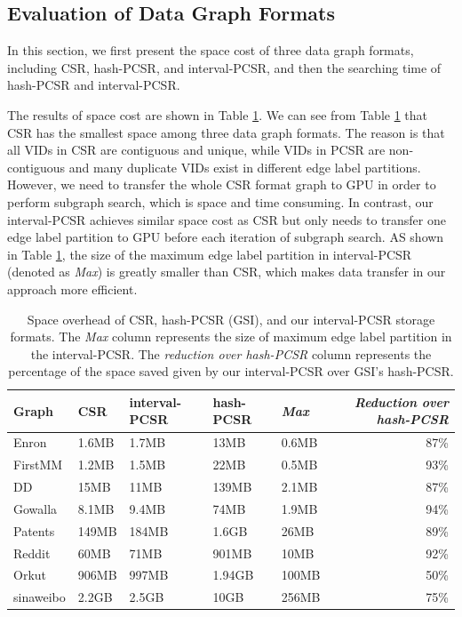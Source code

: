 \subsection{Evaluation of Data Graph Formats}
In this section, we first present the space cost of three data graph formats, including CSR, hash-PCSR, and  interval-PCSR, and then the searching time of hash-PCSR and interval-PCSR.

The results of space cost are shown in Table \ref{tab:graphsize}. We can see from Table \ref{tab:graphsize} that CSR has the smallest space among three data graph formats. The reason is that all VIDs in CSR are contiguous and unique, while VIDs in PCSR are non-contiguous and many duplicate VIDs exist in different edge label partitions. However, we need to transfer the whole CSR format graph to GPU in order to perform subgraph search, which is space and time consuming. In contrast, our interval-PCSR achieves similar space cost as CSR but only needs to transfer one edge label partition to GPU before each iteration of subgraph search. AS shown in Table \ref{tab:graphsize}, the size of the maximum edge label partition in interval-PCSR (denoted as \emph{Max}) is greatly smaller than CSR, which makes data transfer in our approach more efficient.


\begin{table}
\centering
  \caption{Space overhead of CSR, hash-PCSR (GSI), and our interval-PCSR storage formats. The \emph{Max} column represents the size of maximum edge label partition in
  the interval-PCSR. The \emph{reduction over hash-PCSR} column represents the percentage of the space saved given by our interval-PCSR over GSI's hash-PCSR.}
  \label{tab:graphsize}
  \scriptsize
  \begin{tabular}{lllllr}
  \toprule
    \textbf{Graph} &\textbf{CSR}&\textbf{interval-PCSR}&\textbf{hash-PCSR}&\emph{\textbf{Max}}&\emph{Reduction over hash-PCSR}\\
    \midrule
    Enron 		&1.6MB	&1.7MB	&13MB	&0.6MB	&87\% \\
    FirstMM 	&1.2MB	&1.5MB	&22MB	&0.5MB	&93\% \\
    DD 			&15MB	&11MB	&139MB	&2.1MB	&87\% \\
    Gowalla 	&8.1MB	&9.4MB	&74MB	&1.9MB	&94\% \\
    Patents 	&149MB	&184MB	&1.6GB	&26MB	&89\% \\
    Reddit 		&60MB	&71MB	&901MB	&10MB	&92\% \\
    Orkut 		&906MB	&997MB	&1.94GB	&100MB	&50\% \\
    sinaweibo	&2.2GB	&2.5GB	&10GB	&256MB	&75\% \\

    \bottomrule
  \end{tabular}
\end{table}

